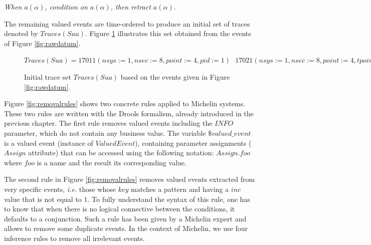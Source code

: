 \textit{When $a(\alpha)$, condition on $a(\alpha)$, then
retract $a(\alpha)$}.

\begin{example}
The remaining valued events are time-ordered to produce an
initial set of traces denoted by $Traces(Sua)$. Figure
\ref{fig:tsua} illustrates this set obtained from the events of
Figure \ref{fig:rawdatum}.

\begin{figure}[ht]
\begin{framed}
    $Traces(Sua) =
    17011(nsys:=1,nsec:=8,point:=4,pid:=1)\text{ }
    17021(nsys:=1,nsec:=8,point:=4,tpoint:=8,pid:=1)\text{ }
    17011(nsys:=1,nsec:=8,point:=4,pid:=2)\text{ }
    17021(nsys:=1,nsec:=8,point:=4,tpoint:=8,pid:=2)$
\end{framed}

\caption{Initial trace set $Traces(Sua)$ based on the events
given in Figure \ref{fig:rawdatum}.}
\label{fig:tsua}
\end{figure}
\end{example}

Figure \ref{fig:removalrules} shows two concrete rules applied to
Michelin systems. These two rules are written with the Drools
formalism, already introduced in the previous chapter. The first
rule removes valued events including the $INFO$ parameter,
which do not contain any business value. The variable
$\$valued\_event$ is a valued event (instance of $ValuedEvent$),
containing parameter assignments ($Assign$ attribute) that can be
accessed using the following notation: $Assign.foo$ where $foo$
is a name and the result its corresponding value.

The second rule in Figure \ref{fig:removalrules} removes valued
events extracted from very specific events, \emph{i.e.} those
whose $key$ matches a pattern and having a $inc$ value that is
not equal to $1$.  To fully understand the syntax of this rule,
one has to know that when there is no logical connective between
the conditions, it defaults to a conjunction.  Such a rule has
been given by a Michelin expert and allows to remove some
duplicate events.  In the context of Michelin, we use four
inference rules to remove all irrelevant events.


